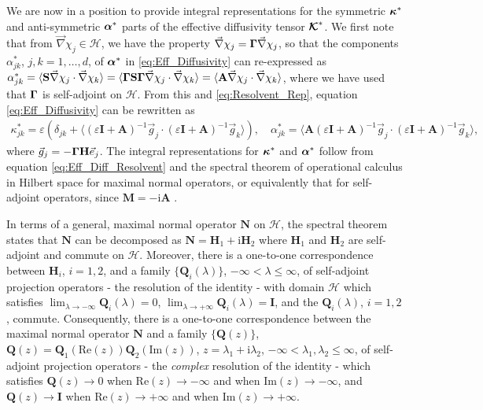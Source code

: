 \documentclass[11pt]{amsart}
\newcommand{\I}{\mathrm{i}}
\newcommand{\Mb}{\mathbf{M}}
\newcommand{\Hb}{\mathbf{H}}
\newcommand{\Ib}{\mathbf{I}}
\newcommand{\Sb}{\mathbf{S}}
\newcommand{\Ab}{\mathbf{A}}
\newcommand{\Qb}{\mathbf{Q}}
\newcommand{\Nb}{\mathbf{N}}
\newcommand\Kbc{\mbox{\boldmath${\mathcal{K}}$}}
\newcommand{\Hs}{\mathscr{H}}
\newcommand\balpha{\mbox{\boldmath${\alpha}$}}
\newcommand\bkappa{\mbox{\boldmath${\kappa}$}}
\newcommand\bGamma{\mbox{\boldmath${\Gamma}$}}
\begin{document}
We are now in a position to provide integral representations for the
symmetric $\bkappa^*$ and anti-symmetric $\balpha^*$ parts of the
effective diffusivity tensor $\Kbc^*$. We first note that from
$\vec{\nabla}\chi_j\in\Hs$, we have the property $\vec{\nabla}\chi_j=\bGamma\vec{\nabla}\chi_j$,
so that the components $\alpha^*_{jk}$, $j,k=1,\ldots,d$, of $\balpha^*$ in
\eqref{eq:Eff_Diffusivity} can re-expressed as
$\alpha^*_{jk}=\langle\Sb\vec{\nabla}\chi_j\cdot\vec{\nabla}\chi_k\rangle=\langle\bGamma\Sb\bGamma\vec{\nabla}\chi_j\cdot\vec{\nabla}\chi_k\rangle 
=\langle\Ab\vec{\nabla}\chi_j\cdot\vec{\nabla}\chi_k\rangle$, where we have used that $\bGamma$ is
self-adjoint on $\Hs$. From this and \eqref{eq:Resolvent_Rep},
equation \eqref{eq:Eff_Diffusivity} can be rewritten as
%
\begin{align}\label{eq:Eff_Diff_Resolvent}
 \kappa^*_{jk}=\varepsilon(\delta_{jk}+\langle(\varepsilon\Ib+\Ab)^{-1}\vec{g}_j\cdot(\varepsilon\Ib+\Ab)^{-1}\vec{g}_k\rangle), \quad
 \alpha^*_{jk}=\langle\Ab(\varepsilon\Ib+\Ab)^{-1}\vec{g}_j\cdot(\varepsilon\Ib+\Ab)^{-1}\vec{g}_k\rangle,
\end{align}
%
where $\vec{g}_j=-\bGamma\Hb\vec{e}_j$. The integral representations
for $\bkappa^*$ and $\balpha^*$ follow from equation
\eqref{eq:Eff_Diff_Resolvent} and the spectral theorem of operational
calculus in Hilbert space for maximal normal operators, or
equivalently that for self-adjoint operators, since $\Mb=-\I\Ab$
\cite{Reed-1980,Stone:64}.






In terms of a general, maximal normal operator $\Nb$ on $\Hs$, the
spectral theorem states that $\Nb$ can be decomposed as $\Nb=\Hb_1+\I
\Hb_2$ where $\Hb_1$ and $\Hb_2$ are self-adjoint and commute on
$\Hs$. Moreover, there is a one-to-one correspondence between $\Hb_i$,
$i=1,2$, and a family $\{\Qb_i(\lambda)\}$, $-\infty<\lambda\leq\infty$, of
self-adjoint projection operators - the resolution of the identity -
with domain $\Hs$ which satisfies $\lim_{\lambda\to-\infty}\Qb_i(\lambda)=0$,
$\lim_{\lambda\to+\infty}\Qb_i(\lambda)=\Ib$, and the $\Qb_i(\lambda)$, $i=1,2$,
commute. Consequently, there is a one-to-one  
correspondence between the maximal normal operator $\Nb$ and a family
$\{\Qb(z)\}$, $\Qb(z)=\Qb_1(\text{Re}(z))\Qb_2(\text{Im}(z))$,
$z=\lambda_1+\I\lambda_2$, $-\infty<\lambda_1,\lambda_2\leq\infty$, of self-adjoint
projection operators - the \emph{complex} resolution of the identity -
which satisfies $\Qb(z)\to0$ when $\text{Re}(z)\to-\infty$ 
and when $\text{Im}(z)\to-\infty$, and $\Qb(z)\to\Ib$ when $\text{Re}(z)\to+\infty$
and when $\text{Im}(z)\to+\infty$.
\end{document}
